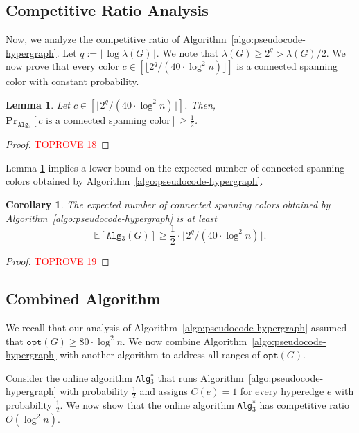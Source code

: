 \documentclass[11pt]{article}
\newtheorem{lemma}{Lemma}
\newtheorem{corollary}{Corollary}
\theoremstyle{definition}
\newcommand{\opt}{\texttt{opt}}
\begin{document}
\subsection{Competitive Ratio Analysis}\label{subsection:raio-analysis}


Now, we analyze the competitive ratio of Algorithm~\ref{algo:pseudocode-hypergraph}. Let $q:=\lfloor \log \lambda(G)\rfloor$. We note that $\lambda(G)\geq 2^q> \lambda(G)/2$. We now prove that every color $c \in [\lfloor 2^q/(40\cdot \log ^2n) \rfloor]$ is a connected spanning color with constant probability.

\begin{lemma}\label{lemma:hypergraph-proper-color-probability}
    Let $c \in [\lfloor 2^q/(40\cdot \log ^2n) \rfloor]$. Then, $\mathbf{Pr}_{\texttt{Alg$_3$} }[c \text{ is a connected spanning color}]\geq \frac{1}{2}$.
\end{lemma}
\begin{proof}\textcolor{red}{TOPROVE 18}\end{proof}

Lemma \ref{lemma:hypergraph-proper-color-probability} implies a lower bound on the expected number of connected spanning colors obtained by Algorithm~\ref{algo:pseudocode-hypergraph}.

\begin{corollary}\label{corollary:number-proper-colors-hyperedge}
    The expected number of connected spanning colors obtained by Algorithm~\ref{algo:pseudocode-hypergraph} is at least $$\mathbb{E}[\texttt{Alg$_3$}(G)]\geq \frac{1}{2}\cdot \lfloor 2^q/(40\cdot \log ^2n) \rfloor.$$
\end{corollary}
\begin{proof}\textcolor{red}{TOPROVE 19}\end{proof}

\subsection{Combined Algorithm}\label{subsection:mixed-algorithm-hypergraph}
We recall that our analysis of Algorithm~\ref{algo:pseudocode-hypergraph} assumed that $\opt(G)\geq 80\cdot \log^2 n$. We now combine Algorithm~\ref{algo:pseudocode-hypergraph} with another algorithm to address all ranges of $\opt(G)$.

Consider the online algorithm \texttt{Alg$_3^*$} that runs Algorithm~\ref{algo:pseudocode-hypergraph} with probability $\frac{1}{2}$ and assigns $C(e)=1$ for every hyperedge $e$ with probability $\frac{1}{2}$. We now show that the online algorithm \texttt{Alg$_3^*$} has competitive ratio $O(\log^2 n)$.
\end{document}
